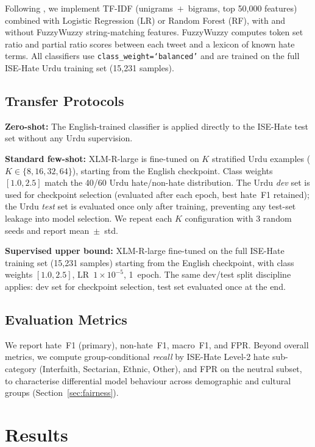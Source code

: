 \documentclass{article}
\begin{document}
Following \citet{ullah2024fuzzy}, we implement TF-IDF (unigrams~$+$~bigrams,
top 50{,}000 features) combined with Logistic Regression (LR) or Random
Forest (RF), with and without FuzzyWuzzy string-matching features.
FuzzyWuzzy computes token set ratio and partial ratio scores between each
tweet and a lexicon of known hate terms.
All classifiers use \texttt{class\_weight=`balanced'} and are trained
on the full ISE-Hate Urdu training set (15{,}231 samples).

\subsection{Transfer Protocols}

\textbf{Zero-shot:} The English-trained classifier is applied directly to
the ISE-Hate test set without any Urdu supervision.

\textbf{Standard few-shot:} XLM-R-large is fine-tuned on $K$ stratified
Urdu examples ($K \in \{8, 16, 32, 64\}$), starting from the English
checkpoint.
Class weights $[1.0, 2.5]$ match the 40/60 Urdu hate/non-hate distribution.
The Urdu \emph{dev} set is used for checkpoint selection
(evaluated after each epoch, best hate~F1 retained);
the Urdu \emph{test} set is evaluated once only after training,
preventing any test-set leakage into model selection.
We repeat each $K$ configuration with 3 random seeds and report
mean~$\pm$~std.

\textbf{Supervised upper bound:} XLM-R-large fine-tuned on the full ISE-Hate
training set (15{,}231 samples) starting from the English checkpoint, with
class weights $[1.0, 2.5]$, LR~$1\times 10^{-5}$, 1~epoch.
The same dev/test split discipline applies: dev set for checkpoint selection,
test set evaluated once at the end.

\subsection{Evaluation Metrics}

We report hate~F1 (primary), non-hate~F1, macro~F1, and FPR.
Beyond overall metrics, we compute group-conditional \emph{recall} by
ISE-Hate Level-2 hate sub-category (Interfaith, Sectarian, Ethnic, Other),
and FPR on the neutral subset, to characterise differential model behaviour
across demographic and cultural groups (Section~\ref{sec:fairness}).

\section{Results}
\label{sec:results}
\end{document}
